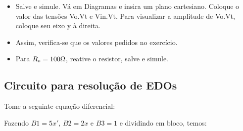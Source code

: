 
\begin{itemize}
    \item Salve e simule. Vá em Diagramas e insira um plano
    cartesiano. Coloque o valor das tensões Vo.Vt e
    Vin.Vt. Para visualizar a amplitude de Vo.Vt, coloque
    seu eixo y à direita.
\end{itemize}



\begin{itemize}
    \item Assim, verifica-se que os valores pedidos no exercício.
\end{itemize}


\begin{itemize}
    \item Para $R_o=100\ohm$, reative o resistor, salve e simule.
\end{itemize}



\subsection{Circuito para resolução de EDOs}

Tome a seguinte equação diferencial:


Fazendo $B1=5x', \, B2=2x$ e $B3=1$ e dividindo em bloco, temos:

\vspace{.5cm}

